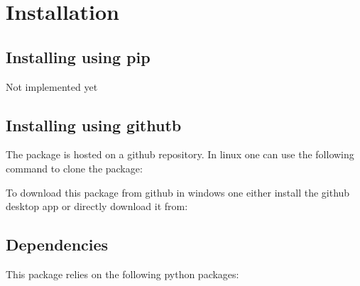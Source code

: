 \documentclass[letterpaper,10pt,english]{sphinxmanual}
\begin{document}
\sphinxstepscope


\section{Installation}
\label{\detokenize{installation:installation}}\label{\detokenize{installation::doc}}

\subsection{Installing using pip}
\label{\detokenize{installation:installing-using-pip}}
\sphinxAtStartPar
Not implemented yet


\subsection{Installing using githutb}
\label{\detokenize{installation:installing-using-githutb}}
\sphinxAtStartPar
The package is hosted on a github repository. In linux one can use
the following command to clone the package:

\begin{sphinxVerbatim}[commandchars=\\\{\}]
  
\end{sphinxVerbatim}

\sphinxAtStartPar
To download this package from github in windows one either install the github
desktop app or directly download it from:

\begin{sphinxVerbatim}[commandchars=\\\{\}]
\end{sphinxVerbatim}


\subsection{Dependencies}
\label{\detokenize{installation:dependencies}}
\sphinxAtStartPar
This package relies on the following python packages:

\begin{sphinxVerbatim}[commandchars=\\\{\}]
\end{sphinxVerbatim}
\end{document}
